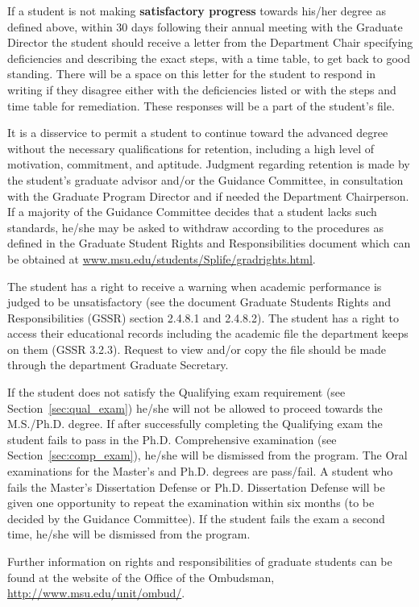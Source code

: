 If a student is not making \textbf{satisfactory progress} towards
his/her degree as defined above, within 30 days following their annual
meeting with the Graduate Director the student should receive a letter
from the Department Chair specifying deficiencies and describing the
exact steps, with a time table, to get back to good standing.  There
will be a space on this letter for the student to respond in writing
if they disagree either with the deficiencies listed or with the steps
and time table for remediation. These responses will be a part of the
student's file.

It is a disservice to permit a student to continue toward the advanced
degree without the necessary qualifications for retention, including a
high level of motivation, commitment, and aptitude.  Judgment
regarding retention is made by the student's graduate advisor and/or
the Guidance Committee, in consultation with the Graduate Program
Director and if needed the Department Chairperson.  If a majority of
the Guidance Committee decides that a
student lacks such standards, he/she may be asked to withdraw
according to the procedures as defined in the Graduate Student Rights
and Responsibilities document which can be obtained at
\url{www.msu.edu/students/Splife/gradrights.html}.

The student has a right to receive a warning when academic performance
is judged to be unsatisfactory (see the document Graduate Students
Rights and Responsibilities (GSSR) section 2.4.8.1 and 2.4.8.2).  The
student has a right to access their educational records including the
academic file the department keeps on them (GSSR 3.2.3).  Request to
view and/or copy the file should be made through the department
Graduate Secretary.

If the student does not satisfy the Qualifying exam requirement (see
Section~\ref{sec:qual_exam}) he/she will not be allowed to proceed
towards the M.S./Ph.D. degree.  If after successfully completing the
Qualifying exam the student fails to pass in the Ph.D. Comprehensive
examination (see Section~\ref{sec:comp_exam}), he/she will be
dismissed from the program.  The Oral examinations for the Master's
and Ph.D. degrees are pass/fail.  A student who fails the Master's
Dissertation Defense or Ph.D. Dissertation Defense will be given one
opportunity to repeat the examination within six months (to be decided
by the Guidance Committee).  If the student fails the exam a second
time, he/she will be dismissed from the program.

Further information on rights and responsibilities of graduate
students can be found at the website of the Office of the Ombudsman,
\url{http://www.msu.edu/unit/ombud/}.

 
